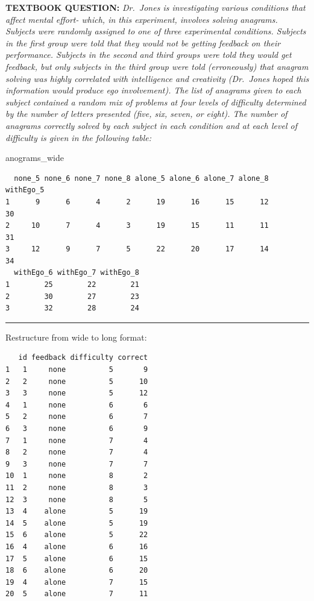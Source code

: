 \documentclass[]{article}
\newenvironment{Shaded}{\begin{snugshade}}{\end{snugshade}}
\newcommand{\NormalTok}[1]{#1}
\begin{document}
\textbf{TEXTBOOK QUESTION:} \emph{Dr.~Jones is investigating various
conditions that affect mental effort- which, in this experiment,
involves solving anagrams. Subjects were randomly assigned to one of
three experimental conditions. Subjects in the first group were told
that they would not be getting feedback on their performance. Subjects
in the second and third groups were told they would get feedback, but
only subjects in the third group were told (erroneously) that anagram
solving was highly correlated with intelligence and creativity
(Dr.~Jones hoped this information would produce ego involvement). The
list of anagrams given to each subject contained a random mix of
problems at four levels of difficulty determined by the number of
letters presented (five, six, seven, or eight). The number of anagrams
correctly solved by each subject in each condition and at each level of
difficulty is given in the following table:}

\begin{Shaded}
\begin{Highlighting}[]
\NormalTok{anograms_wide}
\end{Highlighting}
\end{Shaded}

\begin{verbatim}
  none_5 none_6 none_7 none_8 alone_5 alone_6 alone_7 alone_8 withEgo_5
1      9      6      4      2      19      16      15      12        30
2     10      7      4      3      19      15      11      11        31
3     12      9      7      5      22      20      17      14        34
  withEgo_6 withEgo_7 withEgo_8
1        25        22        21
2        30        27        23
3        32        28        24
\end{verbatim}

\begin{center}\rule{0.5\linewidth}{\linethickness}\end{center}

Restructure from wide to long format:

\begin{verbatim}
   id feedback difficulty correct
1   1     none          5       9
2   2     none          5      10
3   3     none          5      12
4   1     none          6       6
5   2     none          6       7
6   3     none          6       9
7   1     none          7       4
8   2     none          7       4
9   3     none          7       7
10  1     none          8       2
11  2     none          8       3
12  3     none          8       5
13  4    alone          5      19
14  5    alone          5      19
15  6    alone          5      22
16  4    alone          6      16
17  5    alone          6      15
18  6    alone          6      20
19  4    alone          7      15
20  5    alone          7      11
\end{verbatim}
\end{document}
